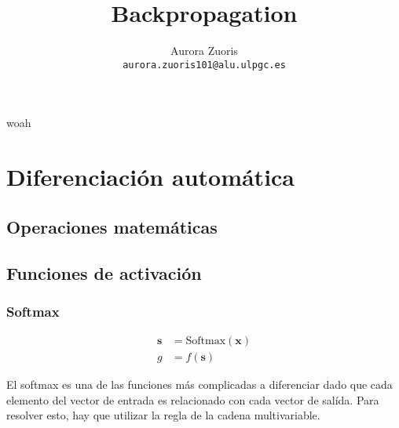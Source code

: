 \documentclass{article}
\title{Backpropagation}
\author{Aurora Zuoris \\ \texttt{aurora.zuoris101@alu.ulpgc.es}}
\begin{document}
\maketitle

woah

\section{Diferenciación automática}

\subsection{Operaciones matemáticas}

\newpage

\subsection{Funciones de activación}

\subsubsection*{Softmax}

\begin{align*}
	\bm{s} &= \text{Softmax}(\bm{x}) \\
	g &= f(\bm{s})
\end{align*}

El softmax es una de las funciones más complicadas a diferenciar
dado que cada elemento del vector de entrada es relacionado con
cada vector de salída.
Para resolver esto, hay que utilizar la regla de la cadena multivariable.

\def\empty{null}
\end{document}
